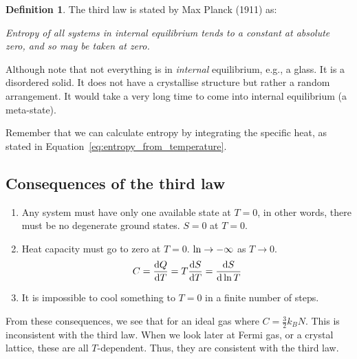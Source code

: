 \documentclass[12pt,chapterprefix=false,dvipsnames]{scrbook}
\theoremstyle{dotless}
\theoremstyle{definition}
\newtheorem{protodefinition}{Definition}[section]
\newenvironment{definition}
{\colorlet{shadecolor}{black!15}\begin{shaded}\begin{protodefinition}}
			{\end{protodefinition}\end{shaded}}
\begin{document}
\begin{definition}
	The third law is stated by Max Planck (1911) as:

	\textit{Entropy of all systems in internal equilibrium tends to a
		constant at absolute zero, and so may be taken at zero.}
\end{definition}

Although note that not everything is in \textit{internal}
equilibrium, e.g., a glass. It is a disordered solid. It does
not have a crystallise structure but rather a random
arrangement. It would take a very long time to come into
internal equilibrium (a meta-state).

Remember that we can calculate entropy by integrating the
specific heat, as stated in Equation~\ref{eq:entropy_from_temperature}.

\subsection{Consequences of the third law}%
\label{sub:consequences_of_the_third_law}

\begin{enumerate}
	\item Any system must have only one available state at
	      $T = 0$, in other words, there must be no
	      degenerate ground states. $S = 0$ at
	      $T = 0$.
	\item Heat capacity must go to zero at $T = 0$.
	      $\naturallogarithm \rightarrow -\infty$ as $T \rightarrow 0$.
	      \begin{equation}
		      C = \dv{Q}{T} = T\dv{S}{T} =
		      \dv{S}{\naturallogarithm{T}}
	      \end{equation}
	\item It is impossible to cool something to $T=0$ in
	      a finite number of steps.
\end{enumerate}

From these consequences, we see that for an ideal gas where
$C = \frac{3}{2}k_{B}N$. This is inconsistent with the third
law. When we look later at Fermi gas, or a crystal lattice,
these are all $T$-dependent. Thus, they are
consistent with the third law.
\end{document}
